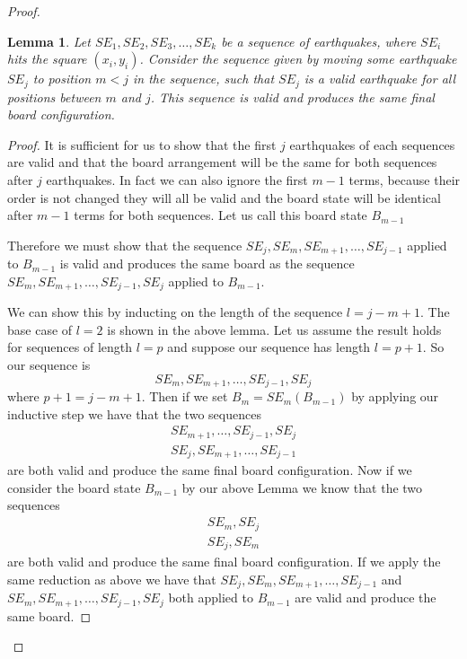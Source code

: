 \documentclass[11pt]{article}
\newtheorem{lemma}{Lemma}
\begin{document}
\begin{proof}
\begin{lemma}
Let $SE_1,SE_2,SE_3,\dots, SE_k$ be a sequence of earthquakes, where $SE_i$ hits the square $(x_i, y_i)$. Consider  the sequence given by moving some earthquake $SE_j$ to position $m<j$ in the sequence, such that $SE_j$ is a valid earthquake for all positions between $m$ and $j$. 
This sequence is valid and produces the same final board configuration.
\end{lemma}
\begin{proof}
It is sufficient for us to show that the first $j$ earthquakes of each sequences are valid and that the board arrangement will be the same for both sequences after $j$ earthquakes. In fact we can also ignore the first $m-1$ terms, because their order is not changed they will all be valid and the board state will be identical after $m-1$ terms for both sequences. Let us call this board state $B_{m-1}$

Therefore we must show that the sequence $SE_j, SE_m, SE_{m+1}, \ldots, SE_{j-1}$ applied to $B_{m-1}$ is valid and produces the same board as the sequence $SE_m, SE_{m+1}, \ldots, SE_{j-1}, SE_j$ applied to $B_{m-1}$. 

We can show this by inducting on the length of the sequence $l=j-m+1$. The base case of $l=2$ is shown in the above lemma. Let us assume the result holds for sequences of length $l=p$ and suppose our sequence has length $l=p+1$. So our sequence is 
\begin{equation*}
SE_m, SE_{m+1}, \ldots, SE_{j-1}, SE_j
\end{equation*}
where $p+1=j-m+1$. Then if we set $B_{m} = SE_{m} (B_{m-1})$ by applying our inductive step we have that the two sequences 
\begin{align*}
SE_{m+1}, \ldots, SE_{j-1}, SE_{j} \\ 
SE_{j}, SE_{m+1}, \ldots,  SE_{j-1} 
\end{align*}
are both valid and produce the same final board configuration. Now if we consider the board state $B_{m-1}$ by our above Lemma we know that the two sequences 
\begin{align*}
SE_{m}, SE_{j} \\
SE_{j}, SE_{m}
\end{align*}
are both valid and produce the same final board configuration. If we apply the same reduction as above  we have  that $SE_j, SE_m, SE_{m+1}, \ldots, SE_{j-1}$  and $SE_m, SE_{m+1}, \ldots, SE_{j-1}, SE_j$ both applied to $B_{m-1}$ are valid and produce the same board. 
\end{proof}


\end{proof}
\end{document}
